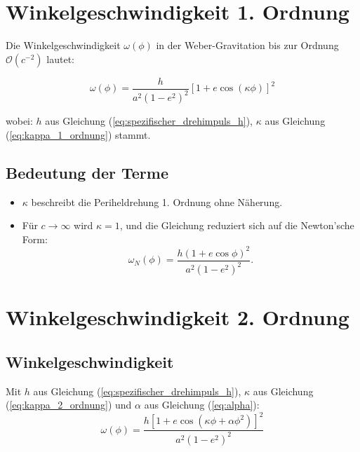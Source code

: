 \newpage
\section{Winkelgeschwindigkeit 1. Ordnung}
Die Winkelgeschwindigkeit \(\omega(\phi)\) in der Weber-Gravitation bis zur Ordnung \(\mathcal{O}(c^{-2})\) lautet:

\begin{equation}
\omega(\phi) = \frac{h}{a^2(1 - e^2)^2} \left[1 + e \cos\left(\kappa\phi\right)\right]^2
\end{equation}

wobei:
$h$ aus Gleichung (\ref{eq:spezifischer_drehimpuls_h}), $\kappa$ aus Gleichung (\ref{eq:kappa_1_ordnung}) stammt.

\subsection*{Bedeutung der Terme}
\begin{itemize}
    \item \(\kappa\) beschreibt die Periheldrehung 1. Ordnung ohne Näherung.
    \item Für \(c \to \infty\) wird \(\kappa = 1\), und die Gleichung reduziert sich auf die Newton’sche Form:
    \[
    \omega_N(\phi) = \frac{h(1 + e \cos\phi)^2}{a^2(1 - e^2)^2}.
    \]
\end{itemize}

\section{Winkelgeschwindigkeit 2. Ordnung}

\subsection{Winkelgeschwindigkeit}
Mit $h$ aus Gleichung (\ref{eq:spezifischer_drehimpuls_h}), $\kappa$ aus Gleichung (\ref{eq:kappa_2_ordnung}) und $\alpha$ aus Gleichung (\ref{eq:alpha}):
\begin{equation}
\boxed
{
    \omega(\phi) = \frac{h[1 + e\cos(\kappa\phi + \alpha\phi^2)]^2}{a^2(1-e^2)^2}
}
\end{equation}
